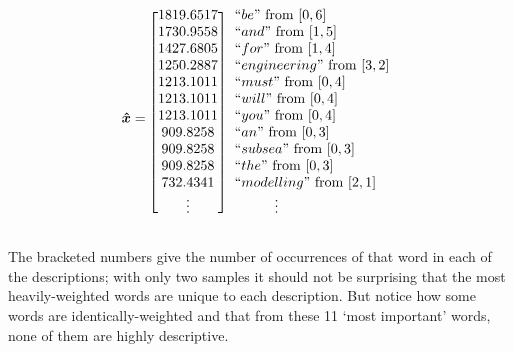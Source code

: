 \documentclass[12pt]{article}
\begin{document}
    \begin{equation*}
        \bm{\hat{x}} = 
        \begin{blockarray}{[c] l}
            1819.6517 & ``be"           \text{ from } [0, 6] \\
            1730.9558 & ``and"          \text{ from } [1, 5] \\
            1427.6805 & ``for"          \text{ from } [1, 4] \\
            1250.2887 & ``engineering"  \text{ from } [3, 2] \\
            1213.1011 & ``must"         \text{ from } [0, 4] \\
            1213.1011 & ``will"         \text{ from } [0, 4] \\
            1213.1011 & ``you"          \text{ from } [0, 4] \\
            909.8258 & ``an"            \text{ from } [0, 3] \\
            909.8258 & ``subsea"        \text{ from } [0, 3] \\
            909.8258 & ``the"           \text{ from } [0, 3] \\
            732.4341 & ``modelling"     \text{ from } [2, 1] \\
            \vdots & \hspace{1cm}\vdots
        \end{blockarray}
    \end{equation*}

    The bracketed numbers give the number of occurrences of that word in each
    of the descriptions; with only two samples it should not be surprising that
    the most heavily-weighted words are unique to each description.  But notice
    how some words are identically-weighted and that from these 11 `most
    important' words, none of them are highly descriptive.
    
\end{document}
